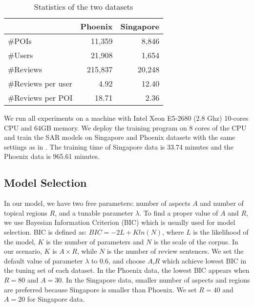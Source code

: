 \begin{table}[th]
\centering
\caption{Statistics of the two datasets}
\begin{tabular}{l|r|r}
\hline
& Phoenix & Singapore\\
\hline
\#POIs & 11,359 & 8,846 \\
\hline
\#Users & 21,908 & 1,654 \\
\hline
\#Reviews & 215,837 & 20,248 \\
\hline
\#Reviews per user & 4.92  & 12.40\\
\hline
\#Reviews per POI & 18.71 & 2.36\\
\hline
\end{tabular}
\label{tab:data}
\end{table}

We run all experiments on a machine with
Intel Xeon E5-2680 (2.8 Ghz) 10-cores CPU and 64GB memory.
We deploy the training program on 8 cores of the CPU and
train the SAR models on Singapore
and Phoenix datasets with the same settings as in .
The training time of Singapore data is 33.74 minutes and the
Phoenix data is 965.61 minutes.

\subsection{Model Selection}
\label{sec:para}
In our model, we have two free parameters: number of
aspects $A$ and number of topical regions $R$, and a
tunable parameter $\lambda$. To find a proper value of
$A$ and $R$, we use Bayesian Information Criterion (BIC)
which is usually used for model selection.
BIC is defined as: $BIC=-2L+Kln(N)$,
where $L$ is the likelihood of the model, $K$ is the number of parameters
and $N$ is the scale of the corpus. In our scenario, $K$ is
$A\times R$, while $N$ is the number of review sentences.
We set the default value of parameter $\lambda$ to 0.6,
and choose $A$,$R$ which achieve lowest BIC in the tuning set of each dataset.
In the Phoenix data, the lowest BIC appears when $R=80$
and $A=30$.
In the Singapore data, smaller number of aspects and regions are preferred
because Singapore is smaller than Phoenix. We set $R=40$ and $A=20$ for
Singapore data.

